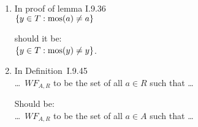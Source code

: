 \begin{enumerate}

\item
In proof of lemma I.9.36\\
\(\{y \in T: {\rm mos}(a) \neq a\}\)

should it be:\\
\(\{y \in T: {\rm mos}(y) \neq y\}\).

\item
In Definition~I.9.45 \\
\ldots\ \(WF_{A,R}\) to be the set of all \(a \in R\) such that \ldots

Should be:\\
\ldots\ \(WF_{A,R}\) to be the set of all \(a \in A\) such that \ldots

\end{enumerate}



\iftrue
 
\else
\fi


% 



\printindex



